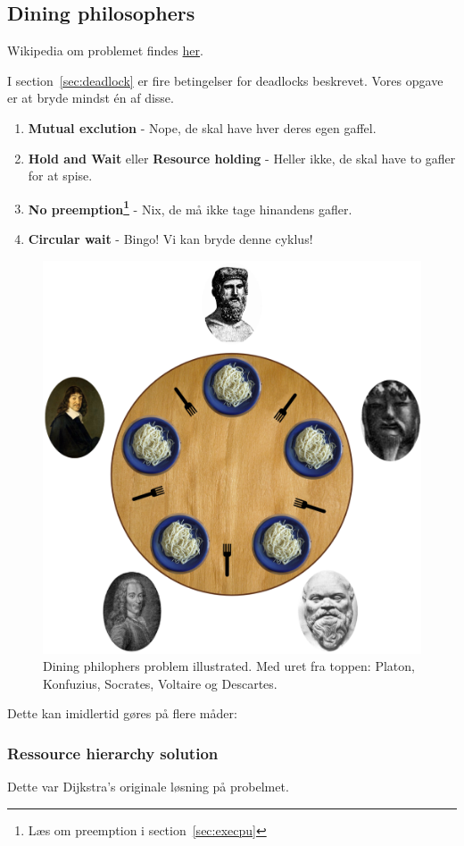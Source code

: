 \subsection{Dining philosophers}
Wikipedia om problemet findes \href{https://en.wikipedia.org/wiki/Dining_philosophers_problem}{her}.

I section~\ref{sec:deadlock} er fire betingelser for deadlocks beskrevet. Vores opgave er at bryde mindst én af disse.

\begin{enumerate}
	\item \textbf{Mutual exclution} - Nope, de skal have hver deres egen gaffel.
	\item \textbf{Hold and Wait} eller \textbf{Resource holding} - Heller ikke, de skal have to gafler for at spise.
	\item \textbf{No preemption\footnote{Læs om preemption i section~\ref{sec:execpu}}} - Nix, de må ikke tage hinandens gafler.
	\item \textbf{Circular wait} - Bingo! Vi kan bryde denne cyklus!
\end{enumerate}

\begin{figure}[h]
	\centering
	\includegraphics[width=0.5\linewidth]{figs/spm2/dining}
	\caption{Dining philophers problem illustrated. Med uret fra toppen: Platon, Konfuzius, Socrates, Voltaire og Descartes.}
	\label{fig:dining}
\end{figure}

Dette kan imidlertid gøres på flere måder:

\subsubsection{Ressource hierarchy solution}
Dette var Dijkstra's originale løsning på probelmet.


